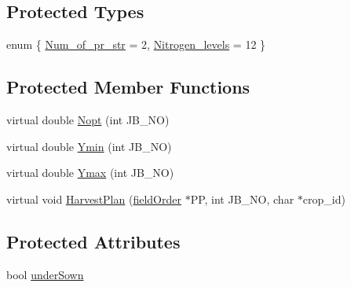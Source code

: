 \subsection*{Protected Types}
\begin{DoxyCompactItemize}
\item 
enum \{ \hyperlink{classstatic_sbarley_af5dc35adc9b23d34384d30da8097a715a67e0023c1714c59989f0dc245aadb552}{Num\_\-of\_\-pr\_\-str} = 2, 
\hyperlink{classstatic_sbarley_af5dc35adc9b23d34384d30da8097a715a82ba905e2d8d5d51789e76f694e19309}{Nitrogen\_\-levels} = 12
 \}
\end{DoxyCompactItemize}
\subsection*{Protected Member Functions}
\begin{DoxyCompactItemize}
\item 
virtual double \hyperlink{classstatic_sbarley_ac550edbfef10d54849187db782f641d4}{Nopt} (int JB\_\-NO)
\item 
virtual double \hyperlink{classstatic_sbarley_acf728af22466b5ba9d3892ba8de07a06}{Ymin} (int JB\_\-NO)
\item 
virtual double \hyperlink{classstatic_sbarley_a9b64302a29ec8eb3eed5d12754fee531}{Ymax} (int JB\_\-NO)
\item 
virtual void \hyperlink{classstatic_sbarley_abdb535e92f8862e38dc0f6860d54cd80}{HarvestPlan} (\hyperlink{classfield_order}{fieldOrder} $\ast$PP, int JB\_\-NO, char $\ast$crop\_\-id)
\end{DoxyCompactItemize}
\subsection*{Protected Attributes}
\begin{DoxyCompactItemize}
\item 
bool \hyperlink{classstatic_sbarley_a597a09bd47e47f7fad390ba49185356e}{underSown}
\end{DoxyCompactItemize}


